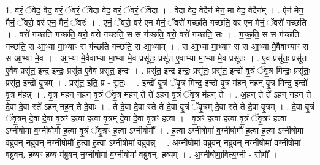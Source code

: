 \documentclass[17pt]{extarticle}
\begin{document}
1. वरं॒ ॅवेद॒ वेद॒ वरं॒ ॅवरं॒ ॅवेदा वेद॒ वरं॒ ॅवरं॒ ॅवेदा । . वेदा वेद॒ वेदैन॑ मेन॒ मा वेद॒ वेदैन᳚म् । . ऐन॑ मेन॒ मैनं॒ ॅवरो॒ वर॑ एन॒ मैनं॒ ॅवरः॑ । . ए॒नं॒ ॅवरो॒ वर॑ एन मेनं॒ ॅवरो॑ गच्छति गच्छति॒ वर॑ एन मेनं॒ ॅवरो॑ गच्छति । . वरो॑ गच्छति गच्छति॒ वरो॒ वरो॑ गच्छति॒ स स ग॑च्छति॒ वरो॒ वरो॑ गच्छति॒ सः । . ग॒च्छ॒ति॒ स स ग॑च्छति गच्छति॒ स आ॒भ्या मा॒भ्याꣳ स ग॑च्छति गच्छति॒ स आ॒भ्याम् । . स आ॒भ्या मा॒भ्याꣳ स स आ॒भ्या मे॒वैवाभ्याꣳ स स आ॒भ्या मे॒व । . आ॒भ्या मे॒वैवाभ्या मा॒भ्या मे॒व प्रसू॑तः॒ प्रसू॑त ए॒वाभ्या मा॒भ्या मे॒व प्रसू॑तः । . ए॒व प्रसू॑तः॒ प्रसू॑त ए॒वैव प्रसू॑त॒ इन्द्र॒ इन्द्रः॒ प्रसू॑त ए॒वैव प्रसू॑त॒ इन्द्रः॑ । . प्रसू॑त॒ इन्द्र॒ इन्द्रः॒ प्रसू॑तः॒ प्रसू॑त॒ इन्द्रो॑ वृ॒त्रं ॅवृ॒त्र मिन्द्रः॒ प्रसू॑तः॒ प्रसू॑त॒ इन्द्रो॑ वृ॒त्रम् । . प्रसू॑त॒ इति॒ प्र - सू॒तः॒ । . इन्द्रो॑ वृ॒त्रं ॅवृ॒त्र मिन्द्र॒ इन्द्रो॑ वृ॒त्र म॑हन् नहन् वृ॒त्र मिन्द्र॒ इन्द्रो॑ वृ॒त्र म॑हन्न् । . वृ॒त्र म॑हन् नहन् वृ॒त्रं ॅवृ॒त्र म॑ह॒न् ते ते॑ ऽहन् वृ॒त्रं ॅवृ॒त्र म॑ह॒न् ते । . अ॒ह॒न् ते ते॑ ऽहन् नह॒न् ते दे॒वा दे॒वा स्ते॑ ऽहन् नह॒न् ते दे॒वाः । . ते दे॒वा दे॒वा स्ते ते दे॒वा वृ॒त्रं ॅवृ॒त्रम् दे॒वा स्ते ते दे॒वा वृ॒त्रम् । . दे॒वा वृ॒त्रं ॅवृ॒त्रम् दे॒वा दे॒वा वृ॒त्रꣳ ह॒त्वा ह॒त्वा वृ॒त्रम् दे॒वा दे॒वा वृ॒त्रꣳ ह॒त्वा । . वृ॒त्रꣳ ह॒त्वा ह॒त्वा वृ॒त्रं ॅवृ॒त्रꣳ ह॒त्वा ऽग्नीषोमा॑ व॒ग्नीषोमौ॑ ह॒त्वा वृ॒त्रं ॅवृ॒त्रꣳ ह॒त्वा ऽग्नीषोमौ᳚ । . ह॒त्वा ऽग्नीषोमा॑ व॒ग्नीषोमौ॑ ह॒त्वा ह॒त्वा ऽग्नीषोमा॑ वब्रुवन् नब्रुवन् न॒ग्नीषोमौ॑ ह॒त्वा ह॒त्वा ऽग्नीषोमा॑ वब्रुवन्न् । . अ॒ग्नीषोमा॑ वब्रुवन् नब्रुवन् न॒ग्नीषोमा॑ व॒ग्नीषोमा॑ वब्रुवन्. ह॒व्यꣳ ह॒व्य म॑ब्रुवन् न॒ग्नीषोमा॑ व॒ग्नीषोमा॑ वब्रुवन्. ह॒व्यम् । . अ॒ग्नीषोमा॒वित्य॒ग्नी - सोमौ᳚ । \newline
\end{document}

